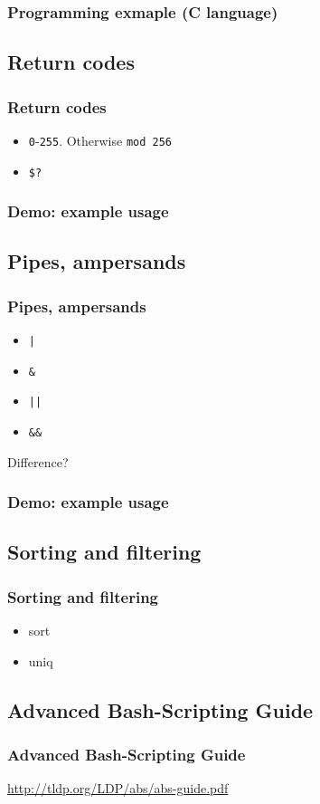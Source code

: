 \documentclass{beamer}
\begin{document}
\begin{frame}
\frametitle{Programming exmaple (C language)}

\end{frame}

\subsection{Return codes}
\begin{frame}
\frametitle{Return codes}
\begin{itemize}
  \item \texttt{0}-\texttt{255}. Otherwise \texttt{mod 256}
  \item \texttt{\$?}
\end{itemize}
\end{frame}

\begin{frame}
\frametitle{Demo: example usage}
\end{frame}

\subsection{Pipes, ampersands}
\begin{frame}
\frametitle{Pipes, ampersands}
\begin{itemize}
  \item \texttt{|}
  \item \texttt{\&}
  \item \texttt{||}
  \item \texttt{\&\&}
\end{itemize}
Difference?
\end{frame}

\begin{frame}
\frametitle{Demo: example usage}
\end{frame}

\subsection{Sorting and filtering}
\begin{frame}
\frametitle{Sorting and filtering}
\begin{itemize}
  \item sort
  \item uniq
\end{itemize}
\end{frame}

\subsection{Advanced Bash-Scripting Guide}
\begin{frame}
\frametitle{Advanced Bash-Scripting Guide}
\begin{center}
  \href{http://tldp.org/LDP/abs/abs-guide.pdf}{http://tldp.org/LDP/abs/abs-guide.pdf}
\end{center}
\end{frame}
\end{document}
